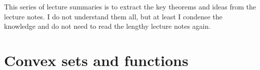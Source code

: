 \documentclass[12pt]{article}
\title{}
\begin{document}
\pagestyle{fancy}
\fancyhf{} %
\cfoot{\thepage}
\renewcommand{\headrulewidth}{1pt}

This series of lecture summaries is to extract the key theorems and ideas from the lecture notes. I do not understand them all, but at least I condense the knowledge and do not need to read the lengthy lecture notes again.

\section{Convex sets and functions}
\end{document}
